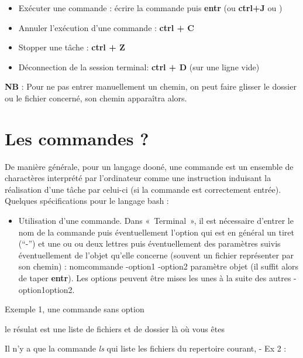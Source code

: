 \begin{itemize}
\tightlist
\item
  Exécuter une commande : écrire la commande puis \textbf{entr} (ou
  \textbf{ctrl+J} ou )
\item
  Annuler l'exécution d'une commande : \textbf{ctrl + C}
\item
  Stopper une tâche : \textbf{ctrl + Z}
\item
  Déconnection de la session terminal: \textbf{ctrl + D} (sur une ligne
  vide)
\end{itemize}

\textbf{NB} : Pour ne pas entrer manuellement un chemin, on peut faire
glisser le dossier ou le fichier concerné, son chemin apparaîtra alors.

\section{Les commandes ?}\label{les-commandes}

De manière générale, pour un langage dooné, une commande est un ensemble
de charactères interprété par l'ordinateur comme une instruction
induisant la réalisation d'une tâche par celui-ci (si la commande est
correctement entrée). Quelques spécifications pour le langage bash :

\begin{itemize}
\tightlist
\item
  Utilisation d'une commande. Dans «~Terminal~», il est nécessaire
  d'entrer le nom de la commande puis éventuellement l'option qui est en
  général un tiret (``-'') et une ou ou deux lettres puis éventuellement
  des paramètres suivis éventuellement de l'objet qu'elle concerne
  (souvent un fichier représenter par son chemin) : nomcommande -option1
  -option2 paramètre objet (il suffit alors de taper \textbf{entr}). Les
  options peuvent être mises les unes à la suite des autres
  -option1option2.
\end{itemize}

Exemple 1, une commande sans option

\begin{Shaded}
\begin{Highlighting}[]
\end{Highlighting}
\end{Shaded}

le résulat est une liste de fichiers et de dossier là où vous êtes

Il n'y a que la commande \emph{ls} qui liste les fichiers du repertoire
courant, - Ex 2 :

